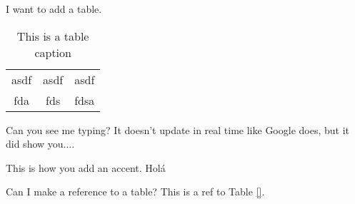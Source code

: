 
I want to add a table.
\begin{table} 
    \begin{tabular}{ c c c }
        asdf & asdf & asdf \\ 
        fda & fds & fdsa \\ 
    \end{tabular} 
    \caption{This is a table caption} 
    \label{tab:test_table_1}
\end{table}

Can you see me typing? It doesn't update in real time like Google does, but it did show you....

This is how you add an accent. Holá

Can I make a reference to a table? This is a ref to Table \ref{}.
